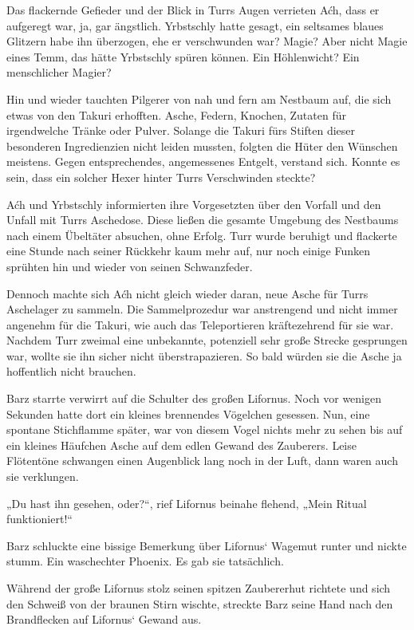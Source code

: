 Das flackernde Gefieder und der Blick in Turrs Augen verrieten Aćh, dass er aufgeregt war, ja, gar ängstlich. Yrbstschly hatte gesagt, ein seltsames blaues Glitzern habe ihn überzogen, ehe er verschwunden war? Magie? Aber nicht Magie eines Temm, das hätte Yrbstschly spüren können. Ein Höhlenwicht? Ein menschlicher Magier?

Hin und wieder tauchten Pilgerer von nah und fern am Nestbaum auf, die sich etwas von den Takuri erhofften. Asche, Federn, Knochen, Zutaten für irgendwelche Tränke oder Pulver. Solange die Takuri fürs Stiften dieser besonderen Ingredienzien nicht leiden mussten, folgten die Hüter den Wünschen meistens. Gegen entsprechendes, angemessenes Entgelt, verstand sich. Konnte es sein, dass ein solcher Hexer hinter Turrs Verschwinden steckte?

Aćh und Yrbstschly informierten ihre Vorgesetzten über den Vorfall und den Unfall mit Turrs Aschedose. Diese ließen die gesamte Umgebung des Nestbaums nach einem Übeltäter absuchen, ohne Erfolg. Turr wurde beruhigt und flackerte eine Stunde nach seiner Rückkehr kaum mehr auf, nur noch einige Funken sprühten hin und wieder von seinen Schwanzfeder.

Dennoch machte sich Aćh nicht gleich wieder daran, neue Asche für Turrs Aschelager zu sammeln. Die Sammelprozedur war anstrengend und nicht immer angenehm für die Takuri, wie auch das Teleportieren kräftezehrend für sie war. Nachdem Turr zweimal eine unbekannte, potenziell sehr große Strecke gesprungen war, wollte sie ihn sicher nicht überstrapazieren. So bald würden sie die Asche ja hoffentlich nicht brauchen.



\trennzeichen



Barz starrte verwirrt auf die Schulter des großen Lifornus. Noch vor wenigen Sekunden hatte dort ein kleines brennendes Vögelchen gesessen. Nun, eine spontane Stichflamme später, war von diesem Vogel nichts mehr zu sehen bis auf ein kleines Häufchen Asche auf dem edlen Gewand des Zauberers. Leise Flötentöne schwangen einen Augenblick lang noch in der Luft, dann waren auch sie verklungen.

„Du hast ihn gesehen, oder?“, rief Lifornus beinahe flehend, „Mein Ritual funktioniert!“

Barz schluckte eine bissige Bemerkung über Lifornus‘ Wagemut runter und nickte stumm. Ein waschechter Phoenix. Es gab sie tatsächlich.

Während der große Lifornus stolz seinen spitzen Zaubererhut richtete und sich den Schweiß von der braunen Stirn wischte, streckte Barz seine Hand nach den Brandflecken auf Lifornus‘ Gewand aus.

